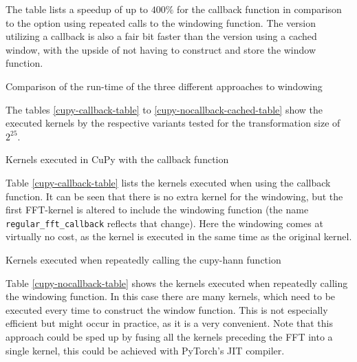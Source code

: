\documentclass[english,11pt,a4paper,table]{article} %
\begin{document}
The table lists a speedup of up to $400\%$ for the callback function in comparison to the option using repeated calls to the windowing function.
The version utilizing a callback is also a fair bit faster than the version using a cached window, with the upside of not having to construct and store the window function.

\begin{table}[h]
	\centering
	\begin{footnotesize}
	
	\end{footnotesize}
	\caption{Comparison of the run-time of the three different approaches to windowing}
	\label{windowing-table}
\end{table}

The tables \ref{cupy-callback-table} to \ref{cupy-nocallback-cached-table} show the executed kernels by the respective variants tested for the transformation size of $2^{25}$.

\begin{table}[H]
	\centering
	\begin{footnotesize}
	
	\end{footnotesize}
	\caption{Kernels executed in CuPy with the callback function}
	\label{cupy-callback-table}
\end{table}

Table \ref{cupy-callback-table} lists the kernels executed when using the callback function.
It can be seen that there is no extra kernel for the windowing, but the first FFT-kernel is altered to include the windowing function (the name \texttt{regular\_fft\_callback} reflects that change).
Here the windowing comes at virtually no cost, as the kernel is executed in the same time as the original kernel.

\begin{table}[H]
	\centering
	\begin{scriptsize}
	
	\end{scriptsize}
	\caption{Kernels executed when repeatedly calling the cupy-hann function}
	\label{cupy-nocallback-table}
\end{table}

Table \ref{cupy-nocallback-table} shows the kernels executed when repeatedly calling the windowing function.
In this case there are many kernels, which need to be executed every time to construct the window function.
This is not especially efficient but might occur in practice, as it is a very convenient.
Note that this approach could be sped up by fusing all the kernels preceding the FFT into a single kernel, this could be achieved with PyTorch's JIT compiler.
\end{document}
